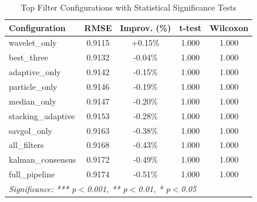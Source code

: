 \begin{table}[htbp]
\centering
\caption{Top Filter Configurations with Statistical Significance Tests}
\label{tab:statistical-significance}
\begin{tabular}{l|c|c|c|c}
\hline
\textbf{Configuration} & \textbf{RMSE} & \textbf{Improv. (\%)} & \textbf{t-test} & \textbf{Wilcoxon} \\
\hline
wavelet\_only & 0.9115 & +0.15\% & 1.000 & 1.000 \\
best\_three & 0.9132 & -0.04\% & 1.000 & 1.000 \\
adaptive\_only & 0.9142 & -0.15\% & 1.000 & 1.000 \\
particle\_only & 0.9146 & -0.19\% & 1.000 & 1.000 \\
median\_only & 0.9147 & -0.20\% & 1.000 & 1.000 \\
stacking\_adaptive & 0.9153 & -0.28\% & 1.000 & 1.000 \\
savgol\_only & 0.9163 & -0.38\% & 1.000 & 1.000 \\
all\_filters & 0.9168 & -0.43\% & 1.000 & 1.000 \\
kalman\_consensus & 0.9172 & -0.49\% & 1.000 & 1.000 \\
full\_pipeline & 0.9174 & -0.51\% & 1.000 & 1.000 \\
\hline
\multicolumn{5}{l}{\textit{Significance: *** p$<$0.001, ** p$<$0.01, * p$<$0.05}} \\
\hline
\end{tabular}
\end{table}
